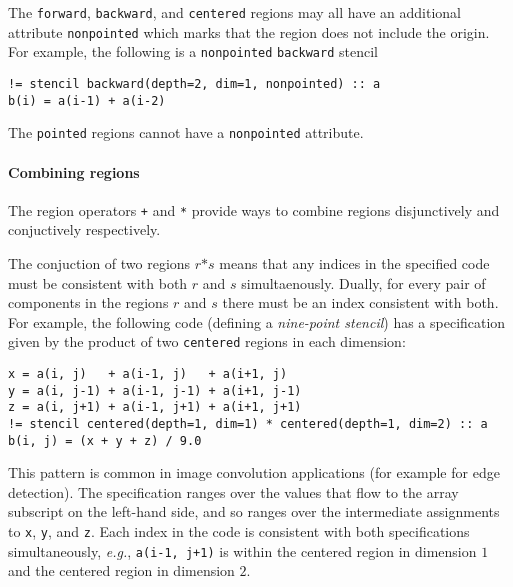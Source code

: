 \documentclass[10pt,preprint]{sigplanconf}
\theoremstyle{definition}
\newcommand{\eg}{\emph{e.g.}}
\newcommand{\term}[1]{\texttt{#1}}
\begin{document}
The \term{forward}, \term{backward}, and \term{centered} regions may
all have an additional attribute \term{nonpointed} which marks that
the region does not include the origin.  For example, the following is a
\term{nonpointed} \term{backward} stencil
%
\begin{verbatim}
!= stencil backward(depth=2, dim=1, nonpointed) :: a
b(i) = a(i-1) + a(i-2)
\end{verbatim}
%
The \term{pointed} regions cannot have a \term{nonpointed} attribute.

\paragraph{Combining regions}




%

The region operators \term{+} and \term{*} provide ways to combine
regions disjunctively and conjuctively respectively.

The conjuction of two regions $r \term{*} s$ means that any indices
in the specified code must be consistent with both $r$ and $s$
simultaenously. Dually, for every pair of components in the regions
$r$ and $s$ there must be an index consistent with both.
For example, the following code (defining a \emph{nine-point stencil})
has a specification given by the product of two \texttt{centered}
regions in each dimension:
\begin{verbatim}
x = a(i, j)   + a(i-1, j)   + a(i+1, j)
y = a(i, j-1) + a(i-1, j-1) + a(i+1, j-1)
z = a(i, j+1) + a(i-1, j+1) + a(i+1, j+1)
!= stencil centered(depth=1, dim=1) * centered(depth=1, dim=2) :: a
b(i, j) = (x + y + z) / 9.0
\end{verbatim}
This pattern is common in image convolution applications (for example
for edge detection). The specification ranges over the
values that flow to the array subscript on the left-hand side,
and so ranges over the intermediate assignments to \term{x},
\term{y}, and \term{z}. Each index in the code is consistent
with both specifications simultaneously, \eg{}, \texttt{a(i-1, j+1)}
is within the centered region in dimension $1$ and the centered region
in dimension $2$.
\end{document}
